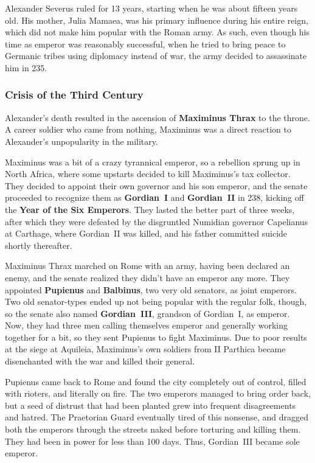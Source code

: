Alexander Severus ruled for 13 years, starting when he was about fifteen years old.
His mother, Julia Mamaea, was his primary influence during his entire reign,
which did not make him popular with the Roman army.
As such, even though his time as emperor was reasonably successful,
when he tried to bring peace to Germanic tribes using diplomacy instead of war,
the army decided to assassinate him in 235.

\subsubsection*{Crisis of the Third Century}

Alexander's death resulted in the ascension of \textbf{Maximinus Thrax} to the throne.
A career soldier who came from nothing,
Maximinus was a direct reaction to Alexander's unpopularity in the military.

Maximinus was a bit of a crazy tyrannical emperor,
so a rebellion sprung up in North Africa,
where some upstarts decided to kill Maximinus's tax collector.
They decided to appoint their own governor and his son emperor,
and the senate proceeded to recognize them as \textbf{Gordian~I} and \textbf{Gordian~II} in 238,
kicking off the \textbf{Year of the Six Emperors}.
They lasted the better part of three weeks,
after which they were defeated by the disgruntled Numidian governor Capelianus at Carthage,
where Gordian~II was killed, and his father committed suicide shortly thereafter.

Maximinus Thrax marched on Rome with an army, having been declared an enemy,
and the senate realized they didn't have an emperor any more.
They appointed \textbf{Pupienus} and \textbf{Balbinus}, two very old senators, as joint emperors.
Two old senator-types ended up not being popular with the regular folk, though,
so the senate also named \textbf{Gordian~III}, grandson of Gordian~I, as emperor.
Now, they had three men calling themselves emperor and generally working together for a bit,
so they sent Pupienus to fight Maximinus.
Due to poor results at the siege at Aquileia,
Maximinus's own soldiers from II Parthica became disenchanted with the war and killed their general.

Pupienus came back to Rome and found the city completely out of control,
filled with rioters, and literally on fire.
The two emperors managed to bring order back,
but a seed of distrust that had been planted grew into frequent disagreements and hatred.
The Praetorian Guard eventually tired of this nonsense,
and dragged both the emperors through the streets naked before torturing and killing them.
They had been in power for less than 100 days.
Thus, Gordian~III became sole emperor.

